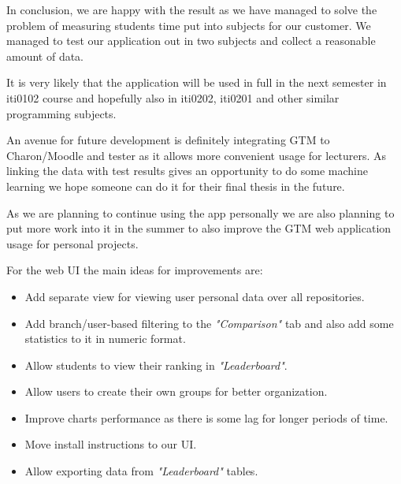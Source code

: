 In conclusion, we are happy with the result as we have managed to solve the problem of measuring students time
put into subjects for our customer.
We managed to test our application out in two subjects and collect a reasonable amount of data.

It is very likely that the application will be used in full in the next semester in iti0102 course and hopefully also in
iti0202, iti0201 and other similar programming subjects.

An avenue for future development is definitely integrating GTM to Charon/Moodle and tester as it allows more convenient usage for lecturers.
As linking the data with test results gives an opportunity to do some machine learning we hope someone can do it for their final thesis in the future.

As we are planning to continue using the app personally we are also planning to put more work into it in the summer to
also improve the GTM web application usage for personal projects.

For the web UI the main ideas for improvements are:
\begin{itemize}
    \item Add separate view for viewing user personal data over all repositories.
    \item Add branch/user-based filtering to the \textit{"Comparison"} tab and also add some statistics to it in numeric format.
    \item Allow students to view their ranking in \textit{"Leaderboard"}.
    \item Allow users to create their own groups for better organization.
    \item Improve charts performance as there is some lag for longer periods of time.
    \item Move install instructions to our UI.
    \item Allow exporting data from \textit{"Leaderboard"} tables.
\end{itemize}

